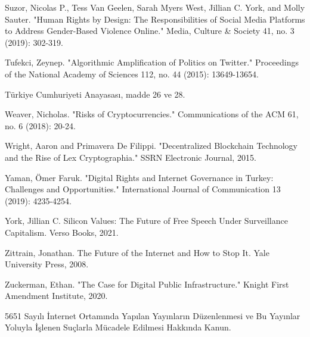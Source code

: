 \documentclass[11pt,a4paper]{article}
\begin{document}
Suzor, Nicolas P., Tess Van Geelen, Sarah Myers West, Jillian C. York, and Molly Sauter. "Human Rights by Design: The Responsibilities of Social Media Platforms to Address Gender-Based Violence Online." Media, Culture & Society 41, no. 3 (2019): 302-319.

Tufekci, Zeynep. "Algorithmic Amplification of Politics on Twitter." Proceedings of the National Academy of Sciences 112, no. 44 (2015): 13649-13654.

Türkiye Cumhuriyeti Anayasası, madde 26 ve 28.

Weaver, Nicholas. "Risks of Cryptocurrencies." Communications of the ACM 61, no. 6 (2018): 20-24.

Wright, Aaron and Primavera De Filippi. "Decentralized Blockchain Technology and the Rise of Lex Cryptographia." SSRN Electronic Journal, 2015.

Yaman, Ömer Faruk. "Digital Rights and Internet Governance in Turkey: Challenges and Opportunities." International Journal of Communication 13 (2019): 4235-4254.

York, Jillian C. Silicon Values: The Future of Free Speech Under Surveillance Capitalism. Verso Books, 2021.

Zittrain, Jonathan. The Future of the Internet and How to Stop It. Yale University Press, 2008.

Zuckerman, Ethan. "The Case for Digital Public Infrastructure." Knight First Amendment Institute, 2020.

5651 Sayılı İnternet Ortamında Yapılan Yayınların Düzenlenmesi ve Bu Yayınlar Yoluyla İşlenen Suçlarla Mücadele Edilmesi Hakkında Kanun.
\end{document}
